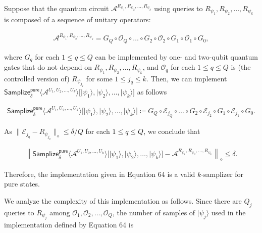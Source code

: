 \documentclass[10pt,a4paper]{article}
\begin{document}
Suppose that the quantum circuit $\mathcal{A}^{R_{\psi_{1}},R_{\psi_{2}},\dots,R_{\psi_{k}}}$ using queries to $R_{\psi_{1}},R_{\psi_{2}},\dots,R_{\psi_{k}}$ is composed of a sequence of unitary operators:\par


\[\begin{gathered}
\mathcal{A}^{R_{\psi_{1}},R_{\psi_{2}},\dots,R_{\psi_{k}}}=G_{Q}\circ\mathcal{O}_{Q}\circ\dots\circ G_{2}\circ\mathcal{O}_{2}\circ G_{1}\circ\mathcal{O}_{1}\circ G_{0},
\end{gathered}\]


where $G_{q}$ for each $1\leq q\leq Q$ can be implemented by one- and two-qubit quantum gates that do not depend on $R_{\psi_{1}},R_{\psi_{2}},\dots,R_{\psi_{k}}$, and $\mathcal{O}_{q}$ for each $1\leq q\leq Q$ is (the controlled version of) $R_{\psi_{j_{q}}}$ for some $1\leq j_{q}\leq k$.
Then, we can implement $\mathsf{Samplize}^{\mathsf{pure}}_{\delta}\big\langle\mathcal{A}^{U_{1},U_{2},\dots,U_{k}}\big\rangle\big[\lvert\psi_{1}\rangle,\lvert\psi_{2}\rangle,\dots,\lvert\psi_{k}\rangle\big]$ as follows\par


\[\begin{gathered}
\mathsf{Samplize}^{\mathsf{pure}}_{\delta}\big\langle\mathcal{A}^{U_{1},U_{2},\dots,U_{k}}\big\rangle\big[\lvert\psi_{1}\rangle,\lvert\psi_{2}\rangle,\dots,\lvert\psi_{k}\rangle\big]\coloneqq G_{Q}\circ\mathcal{E}_{j_{Q}}\circ\dots\circ G_{2}\circ\mathcal{E}_{j_{2}}\circ G_{1}\circ\mathcal{E}_{j_{1}}\circ G_{0}.
\end{gathered}\]


As $\lVert\mathcal{E}_{j_{q}}-R_{\psi_{j_{q}}}\rVert_{\diamond}\leq\delta/Q$ for each $1\leq q\leq Q$, we conclude that\par


\[\begin{gathered}
\left\lVert\mathsf{Samplize}^{\mathsf{pure}}_{\delta}\big\langle\mathcal{A}^{U_{1},U_{2},\dots,U_{k}}\big\rangle\big[\lvert\psi_{1}\rangle,\lvert\psi_{2}\rangle,\dots,\lvert\psi_{k}\rangle\big]-\mathcal{A}^{R_{\psi_{1}},R_{\psi_{2}},\dots,R_{\psi_{k}}}\right\rVert_{\diamond}\leq\delta.
\end{gathered}\]


Therefore, the implementation given in Equation 64 is a valid $k$-samplizer for pure states.\par




We analyze the complexity of this implementation as follows.
Since there are $Q_{j}$ queries to $R_{\psi_{j}}$ among $\mathcal{O}_{1},\mathcal{O}_{2},\dots,\mathcal{O}_{Q}$, the number of samples of $\lvert\psi_{j}\rangle$ used in the implementation defined by Equation 64 is\par
\end{document}
